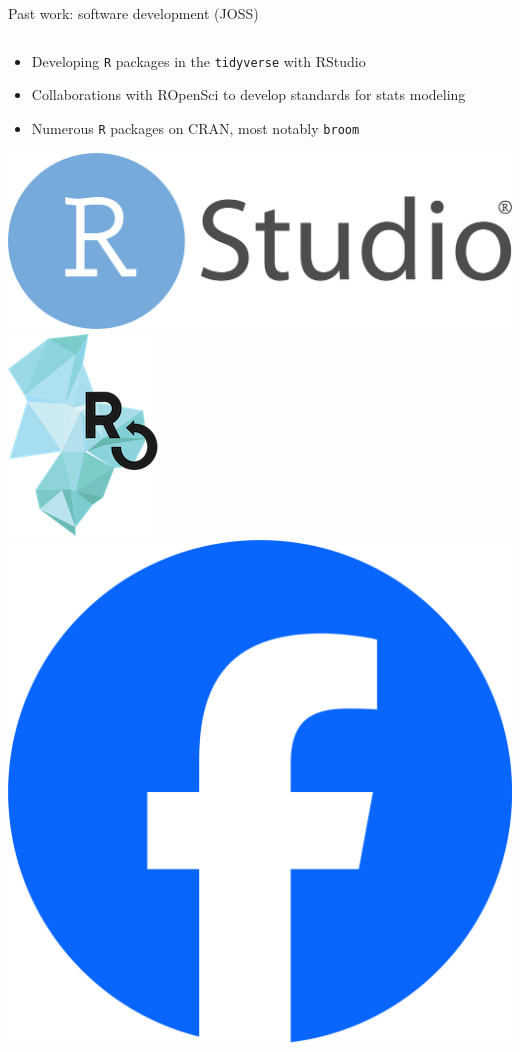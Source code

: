 \documentclass[aspectratio=169]{beamer}
\theoremstyle{remark}
\begin{document}
\begin{frame}{Past work: software development (JOSS)}
    \vfill
    \begin{columns}
        \begin{column}{0.5\textwidth}
            \begin{itemize}
                \item Developing \texttt{R} packages in the \texttt{tidyverse} with RStudio
                \item Collaborations with ROpenSci to develop standards for stats modeling
                \item Numerous \texttt{R} packages on CRAN, most notably \texttt{broom}
            \end{itemize}
            \vspace{6mm}
            \includegraphics[height=0.15\textheight]{./figures/RStudio-Logo-flat.png} \hfill
            \includegraphics[height=0.15\textheight]{./figures/ropensci.png} \hfill
            \includegraphics[height=0.15\textheight]{./figures/Facebook_Logo_Primary.png}

\end{column}
\end{columns}
\end{frame}
\end{document}
